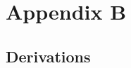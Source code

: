 \chapter{Appendix B}
\ifpdf
    \graphicspath{{Appendix2/Appendix2Figs/PNG/}{Appendix2/Appendix2Figs/PDF/}{Appendix2/Appendix2Figs/}}
\else
    \graphicspath{{Appendix2/Appendix2Figs/EPS/}{Appendix2/Appendix2Figs/}}
\fi


\section{Derivations}